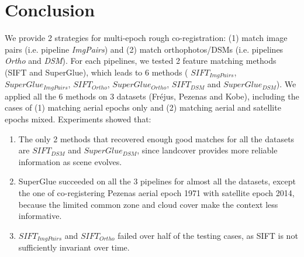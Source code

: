 \section{Conclusion}
We provide 2 strategies for multi-epoch rough co-registration: (1) match image pairs (i.e. pipeline \textit{ImgPairs}) and (2) match orthophotos/DSMs (i.e. pipelines \textit{Ortho} and \textit{DSM}).
For each pipelines, we tested 2 feature matching methods (SIFT and SuperGlue), which leads to 6 methods ( $SIFT_{ImgPairs}$,  $SuperGlue_{ImgPairs}$,  $SIFT_{Ortho}$,  $SuperGlue_{Ortho}$,  $SIFT_{DSM}$ and  $SuperGlue_{DSM}$).
We applied all the 6 methods on 3 datasets (Fr{\'e}jus, Pezenas and Kobe), including the cases of (1) matching aerial epochs only and (2) matching aerial and satellite epochs mixed.
Experiments showed that:\\
\begin{enumerate}
	\item The only 2 methods that recovered enough good matches for all the datasets are $SIFT_{DSM}$ and $SuperGlue_{DSM}$, since landcover provides more reliable information as scene evolves.
	\item SuperGlue succeeded on all the 3 pipelines for almost all the datasets, except the one of co-registering Pezenas aerial epoch 1971 with satellite epoch 2014, because the limited common zone and cloud cover make the context less informative.
	\item $SIFT_{ImgPairs}$ and $SIFT_{Ortho}$ failed over half of the testing cases, as SIFT is not sufficiently invariant over time. 
\end{enumerate}

